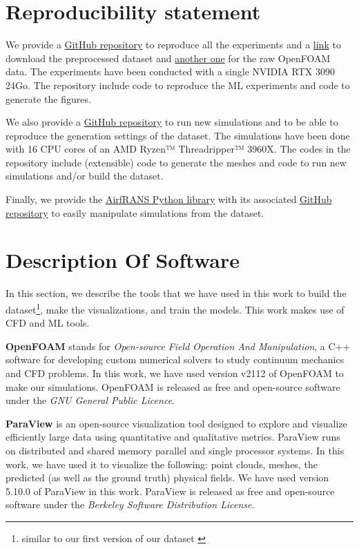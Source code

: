 \begin{subappendices}	
	\section{Reproducibility statement}
	
	We provide a  \href{https://github.com/Extrality/AirfRANS}{GitHub repository} to reproduce all the experiments and a \href{https://data.isir.upmc.fr/extrality/NeurIPS_2022/Dataset.zip}{link} to download the preprocessed dataset and \href{https://data.isir.upmc.fr/extrality/NeurIPS_2022/OF_dataset.zip}{another one} for the raw OpenFOAM data. The experiments have been conducted with a single NVIDIA RTX 3090 24Go. The repository include code to reproduce the \acrfull{ML} experiments and code to generate the figures.
	
	We also provide a \href{https://github.com/Extrality/NACA_simulation}{GitHub repository} to run new simulations and to be able to reproduce the generation settings of the dataset. The simulations have been done with 16 CPU cores of an AMD Ryzen™ Threadripper™ 3960X. The codes in the repository include (extensible) code to generate the meshes and code to run new simulations and/or build the dataset.
	
	Finally, we provide the \href{https://airfrans.readthedocs.io/en/latest/index.html}{AirfRANS Python library} with its associated \href{https://github.com/Extrality/airfrans_lib}{GitHub repository} to easily manipulate simulations from the dataset.
	
	\section{Description Of Software}
	In this section, we describe the tools that we have used in this work to build the dataset\footnote{similar to our first version of our dataset \cite{bonnet2022an}}, make the visualizations, and train the models. This work makes use of \acrfull{CFD} and \acrshort{ML} tools.
	
	\textbf{OpenFOAM} \cite{OpenFOAM} stands for \emph{Open-source Field Operation And Manipulation}, a C++ software for developing custom numerical solvers to study continuum mechanics and \acrshort{CFD} problems. In this work, we have used version v2112 of OpenFOAM to make our simulations. OpenFOAM is released as free and open-source software under the \emph{GNU General Public Licence}.
	
	\textbf{ParaView} \cite{paraview} is an open-source visualization tool designed to explore and visualize efficiently large data using quantitative and qualitative metrics. ParaView runs on distributed and shared memory parallel and single processor systems. In this work, we have used it to visualize the following: point clouds, meshes, the predicted (as well as the ground truth) physical fields. We have used version 5.10.0 of ParaView in this work. ParaView  is released  as free and open-source software under the \emph{Berkeley Software Distribution License}.
	

\end{subappendices}
